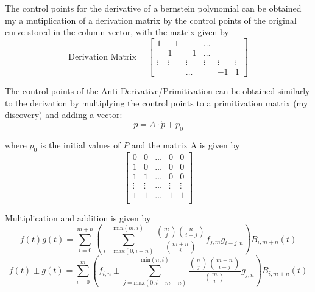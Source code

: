 \par The control points for the derivative of a bernstein polynomial can be obtained my a mutiplication of a derivation matrix by the control points of the original curve stored in the column vector, with the matrix given by 
\begin{equation}
    \text{Derivation Matrix} = 
    \begin{bmatrix}
        1 & -1 & & \ldots & & \\
        & 1 & -1 & \ldots & & \\
        \vdots &  \vdots & \vdots & \vdots & \vdots & \vdots  \\
        & & \ldots & & -1 & 1
    \end{bmatrix}
\end{equation}

\par The control points of the Anti-Derivative/Primitivation can be obtained similarly to the derivation by multiplying the control points to a primitivation matrix (my discovery) and adding a vector:
\begin{equation}
    p = A \cdot \dot{p}  + p_0
\end{equation}

where $p_0$ is the initial values of $P$ and the matrix A is given by 
\begin{equation}
    \begin{bmatrix}
        0 & 0 & \ldots & 0 & 0 \\
        1 & 0 & \ldots & 0 & 0 \\
        1 & 1 & \ldots & 0 & 0 \\
        \vdots & \vdots & \ldots & \vdots & \vdots \\
        1 & 1 & \ldots & 1 & 1 \\
    \end{bmatrix}
\end{equation}




\par Multiplication and addition is given by
\begin{equation}
    \label{eq:bern_mul}
    f(t)g(t) = \sum^{m+n}_{i=0}  \left(\sum_{i=\text{max}(0,i-n)}^{\text{min}(m,i)} \frac{\binom{m}{j}\binom{n}{i-j}}{\binom{m+n}{i}} f_{j,m}g_{i-j,n}\right) B_{i,m+n}(t)
\end{equation}
\begin{equation}
    \label{eq:bern_sum}
    f(t)\pm g(t) = 
    \sum^{m}_{i=0}  \left(f_{i,n} \pm \sum_{j=\text{max}(0,i-m+n)}^{\text{min}(n,i)} \frac{\binom{n}{j}\binom{m-n}{i-j}}{\binom{m}{i}} g_{j,n}\right) B_{i,m+n}(t)
\end{equation}

